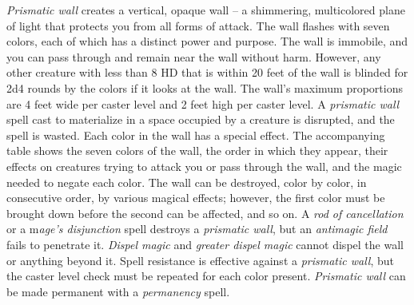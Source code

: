 \textit{Prismatic wall} creates a vertical, opaque wall -- a shimmering, multicolored
plane of light that protects you from all forms of attack. The wall flashes with
seven colors, each of which has a distinct power and purpose. The wall is immobile,
and you can pass through and remain near the wall without harm. However, any other
creature with less than 8 HD that is within 20 feet of the wall is blinded for
2d4 rounds by the colors if it looks at the wall.
The wall's maximum proportions are 4 feet wide per caster level and 2 feet high
per caster level. A \textit{prismatic wall} spell cast to materialize in a space
occupied by a creature is disrupted, and the spell is wasted.
Each color in the wall has a special effect. The accompanying table shows the seven
colors of the wall, the order in which they appear, their effects on creatures
trying to attack you or pass through the wall, and the magic needed to negate each
color.
The wall can be destroyed, color by color, in consecutive order, by various magical
effects; however, the first color must be brought down before the second can be
affected, and so on. A \textit{rod of cancellation} or a m\textit{age's disjunction
}spell destroys a \textit{prismatic wall}, but an \textit{antimagic field} fails
to penetrate it. \textit{Dispel magic} and \textit{greater dispel magic} cannot
dispel the wall or anything beyond it. Spell resistance is effective against a
\textit{prismatic wall}, but the caster level check must be repeated for each color
present.
\textit{Prismatic wall} can be made permanent with a \textit{permanency} spell.
